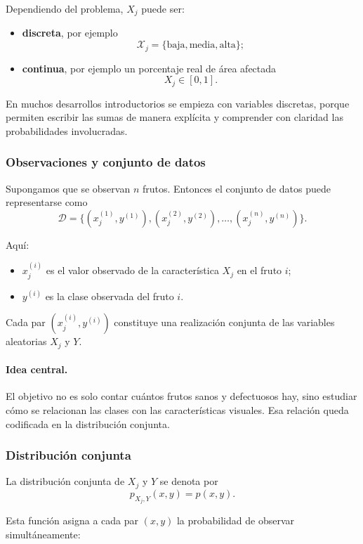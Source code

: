 \documentclass{article}
\begin{document}
Dependiendo del problema, \(X_j\) puede ser:

\begin{itemize}
\item \textbf{discreta}, por ejemplo
\[
\mathcal{X}_j=\{\text{baja},\text{media},\text{alta}\};
\]
\item \textbf{continua}, por ejemplo un porcentaje real de área afectada
\[
X_j \in [0,1].
\]
\end{itemize}

En muchos desarrollos introductorios se empieza con variables discretas, porque permiten escribir las sumas de manera explícita y comprender con claridad las probabilidades involucradas.

\subsubsection*{Observaciones y conjunto de datos}

Supongamos que se observan \(n\) frutos. Entonces el conjunto de datos puede representarse como
\[
\mathcal{D}=\{(x_j^{(1)},y^{(1)}),(x_j^{(2)},y^{(2)}),\dots,(x_j^{(n)},y^{(n)})\}.
\]

Aquí:

\begin{itemize}
\item \(x_j^{(i)}\) es el valor observado de la característica \(X_j\) en el fruto \(i\);
\item \(y^{(i)}\) es la clase observada del fruto \(i\).
\end{itemize}

Cada par \((x_j^{(i)},y^{(i)})\) constituye una realización conjunta de las variables aleatorias \(X_j\) y \(Y\).

\paragraph{Idea central.}
El objetivo no es solo contar cuántos frutos sanos y defectuosos hay, sino estudiar cómo se relacionan las clases con las características visuales. Esa relación queda codificada en la distribución conjunta.

\subsubsection*{Distribución conjunta}

La distribución conjunta de \(X_j\) y \(Y\) se denota por
\[
p_{X_j,Y}(x,y)=p(x,y).
\]

Esta función asigna a cada par \((x,y)\) la probabilidad de observar simultáneamente:
\end{document}
